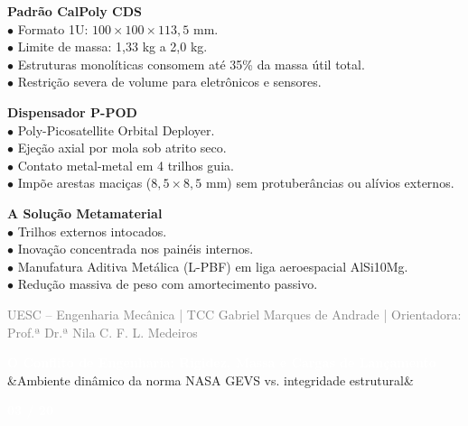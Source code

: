 \documentclass[11pt]{article}
\newcommand{\slideheader}[3]{
    \noindent
    \begin{minipage}{\textwidth}
        \colorbox{SpaceNavy}{
            \parbox{\dimexpr\textwidth-2\fboxsep\relax}{
                \vspace{0.2cm}
                \hspace{0.3cm}
                \begin{minipage}{0.85\textwidth}
                    {\Large \textbf{\textcolor{white}{#1}}}\\[0.1cm]
                    \ifx&#2&\else{\small \textbf{\textcolor{SpaceGold}{#2}}}\fi
                \end{minipage}
                \hfill
                \begin{minipage}{0.10\textwidth}
                    \raggedleft
                    {\large \textbf{\textcolor{white}{#3 / 20}}}\hspace{0.3cm}
                \end{minipage}
                \vspace{0.2cm}
            }
        }
    \end{minipage}
    \vspace{0.4cm}
}
\newcommand{\slidefooter}{
    \vfill
    \noindent
    \begin{minipage}{\textwidth}
        \centering
        \scriptsize \textcolor{gray}{UESC -- Engenharia Mecânica | TCC Gabriel Marques de Andrade | Orientadora: Prof.ª Dr.ª Nila C. F. L. Medeiros}
    \end{minipage}
}
\begin{document}
\begin{minipage}[t]{0.31\textwidth}
    \textbf{\textcolor{NavyAccent}{Padrão CalPoly CDS}}\\[0.2cm]
    \small
    $\bullet$ Formato 1U: $100 \times 100 \times 113{,}5\text{ mm}$.\\
    $\bullet$ Limite de massa: 1,33 kg a 2,0 kg.\\
    $\bullet$ Estruturas monolíticas consomem até 35\% da massa útil total.\\
    $\bullet$ Restrição severa de volume para eletrônicos e sensores.
\end{minipage}
\hfill
\begin{minipage}[t]{0.31\textwidth}
    \textbf{\textcolor{NavyAccent}{Dispensador P-POD}}\\[0.2cm]
    \small
    $\bullet$ Poly-Picosatellite Orbital Deployer.\\
    $\bullet$ Ejeção axial por mola sob atrito seco.\\
    $\bullet$ Contato metal-metal em 4 trilhos guia.\\
    $\bullet$ Impõe arestas maciças ($8{,}5 \times 8{,}5\text{ mm}$) sem protuberâncias ou alívios externos.
\end{minipage}
\hfill
\begin{minipage}[t]{0.31\textwidth}
    \textbf{\textcolor{NavyAccent}{A Solução Metamaterial}}\\[0.2cm]
    \small
    $\bullet$ Trilhos externos intocados.\\
    $\bullet$ Inovação concentrada nos painéis internos.\\
    $\bullet$ Manufatura Aditiva Metálica (L-PBF) em liga aeroespacial AlSi10Mg.\\
    $\bullet$ Redução massiva de peso com amortecimento passivo.
\end{minipage}

\slidefooter
\clearpage

\slideheader{O Conflito de Engenharia: Rigidez, Massa e Cargas de Lançamento}{Ambiente dinâmico da norma NASA GEVS vs. integridade estrutural}{03}
\end{document}
